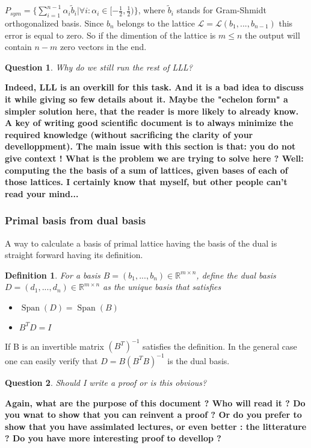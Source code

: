 \documentclass[12pt]{article}
\newcommand{\LL}{\mathcal{L}}
\DeclareMathOperator{\Span}{Span}
\newtheorem{question}{Question}
\newtheorem{definition}{Definition}
\begin{document}
$P_{sym} = \{ \sum_{i = 1}^{n-1}\alpha_{i}\tilde{b}_{i}| \forall i: \alpha_{i} \in [-\frac{1}{2}, \frac{1}{2})\}$, where $\tilde{b}_{i}$ stands for Gram-Shmidt orthogonalized basis. Since $b_{n}$ belongs to the lattice $\LL = \LL(b_{1}, ..., b_{n-1})$
this error is equal to zero. So if the dimention of the lattice is $m \leq n$ the output will contain $n-m$ zero vectors in the end.

\begin{question}
    Why do we still run the rest of LLL?
\end{question}
{\bf Indeed, LLL is an overkill for this task. And it is a bad idea to discuss it while giving so few details about it. Maybe the "echelon form" a simpler solution here, that the reader is more likely to already know. A key of writing good scientific document is to always minimize the required knowledge (without sacrificing the clarity of your develloppment). The main issue with this section is that: you do not give context ! What is the problem we are trying to solve here ? Well: computing the the basis of a sum of lattices, given bases of each of those lattices. I certainly know that myself, but other people can't read your mind...}


\subsubsection{Primal basis from dual basis}
A way to calculate a basis of primal lattice having the basis of the dual is straight forward having its definition.

\begin{definition}
    For a basis $B = (b_{1}, ..., b_{n}) \in \mathbb{R}^{m \times n}$, define the dual basis $D = (d_{1}, ..., d_{n}) \in \mathbb{R}^{m \times n}$ as the unique basis that satisfies
    \begin{itemize}
        \item $\Span(D) = \Span(B)$
        \item $B^{T}D = I$
    \end{itemize}
\end{definition}
If B is an invertible matrix $(B^{T})^{-1}$ satisfies the definition. In the general case one can easily verify that $D = B(B^{T}B)^{-1}$ is the dual basis.

\begin{question}
    Should I write a proof or is this obvious?
\end{question}
{\bf Again, what are the purpose of this document ? Who will read it ? Do you wnat to show that you can reinvent a proof ? Or do you prefer to show that you have assimlated lectures, or even better : the litterature ? Do you have more interesting proof to devellop ?}
\end{document}
